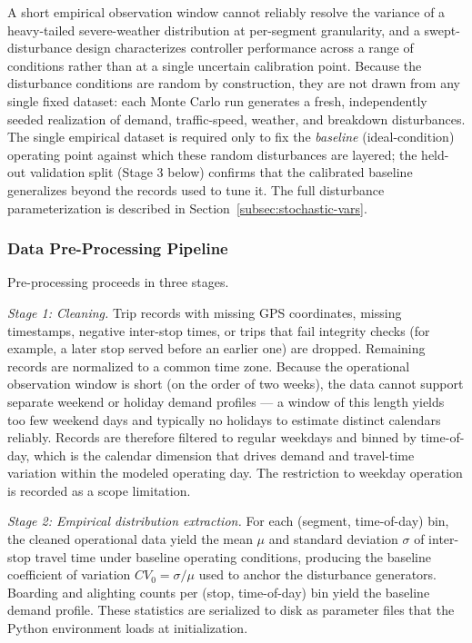 A short empirical observation window cannot reliably resolve the variance of a heavy-tailed severe-weather distribution at per-segment granularity, and a swept-disturbance design characterizes controller performance across a range of conditions rather than at a single uncertain calibration point. Because the disturbance conditions are random by construction, they are not drawn from any single fixed dataset: each Monte Carlo run generates a fresh, independently seeded realization of demand, traffic-speed, weather, and breakdown disturbances. The single empirical dataset is required only to fix the \textit{baseline} (ideal-condition) operating point against which these random disturbances are layered; the held-out validation split (Stage 3 below) confirms that the calibrated baseline generalizes beyond the records used to tune it. The full disturbance parameterization is described in Section~\ref{subsec:stochastic-vars}.

\subsubsection{Data Pre-Processing Pipeline}
\label{subsec:data-pipeline}

Pre-processing proceeds in three stages.

\textit{Stage 1: Cleaning.} Trip records with missing GPS coordinates, missing timestamps, negative inter-stop times, or trips that fail integrity checks (for example, a later stop served before an earlier one) are dropped. Remaining records are normalized to a common time zone. Because the operational observation window is short (on the order of two weeks), the data cannot support separate weekend or holiday demand profiles --- a window of this length yields too few weekend days and typically no holidays to estimate distinct calendars reliably. Records are therefore filtered to regular weekdays and binned by time-of-day, which is the calendar dimension that drives demand and travel-time variation within the modeled operating day. The restriction to weekday operation is recorded as a scope limitation.

\textit{Stage 2: Empirical distribution extraction.} For each (segment, time-of-day) bin, the cleaned operational data yield the mean $\mu$ and standard deviation $\sigma$ of inter-stop travel time under baseline operating conditions, producing the baseline coefficient of variation $CV_0 = \sigma / \mu$ used to anchor the disturbance generators. Boarding and alighting counts per (stop, time-of-day) bin yield the baseline demand profile. These statistics are serialized to disk as parameter files that the Python environment loads at initialization.

